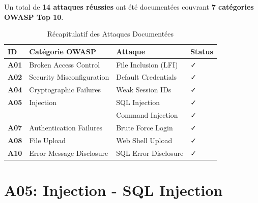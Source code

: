 \documentclass[12pt,a4paper,openany]{report}
\begin{document}
	Un total de \textbf{14 attaques réussies} ont été documentées couvrant \textbf{7 catégories OWASP Top 10}.
	
	\begin{table}[H]
		\centering
		\small
		\renewcommand{\arraystretch}{1.3}
		\begin{tabular}{>{\centering\arraybackslash}p{1.5cm} p{4cm} p{5cm} >{\centering\arraybackslash}p{1.8cm}}
			\hline
			\rowcolor{tableheadbg}
			\textcolor{tableheadfg}{\textbf{ID}} &
			\textcolor{tableheadfg}{\textbf{Catégorie OWASP}} &
			\textcolor{tableheadfg}{\textbf{Attaque}} &
			\textcolor{tableheadfg}{\textbf{Status}} \\
			\hline
			\rowcolor{tablerowalt}
			\textbf{A01} & Broken Access Control & File Inclusion (LFI) & ✓ \\
			
			\textbf{A02} & Security Misconfiguration & Default Credentials & ✓ \\
			
			\rowcolor{tablerowalt}
			\textbf{A04} & Cryptographic Failures & Weak Session IDs & ✓ \\
			
			\textbf{A05} & Injection & SQL Injection & ✓ \\
			
			\rowcolor{tablerowalt}
			& & Command Injection & ✓ \\
			
			\textbf{A07} & Authentication Failures & Brute Force Login & ✓ \\
			
			\rowcolor{tablerowalt}
			\textbf{A08} & File Upload & Web Shell Upload & ✓ \\
			
			\textbf{A10} & Error Message Disclosure & SQL Error Disclosure & ✓ \\
			\hline
		\end{tabular}
		\caption{Récapitulatif des Attaques Documentées}
		\label{tab:attack-summary}
	\end{table}
	
	
	\section{A05: Injection - SQL Injection}
	
\end{document}
